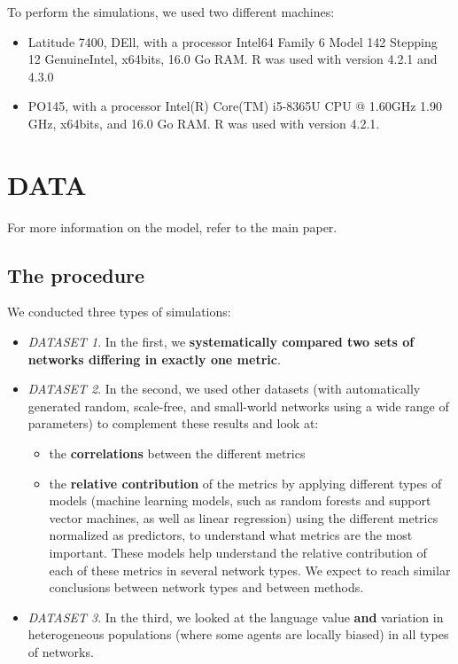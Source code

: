 \documentclass[
]{article}
\providecommand{\tightlist}{%
  \setlength{\itemsep}{0pt}\setlength{\parskip}{0pt}}
\begin{document}
To perform the simulations, we used two different machines:

\begin{itemize}
\tightlist
\item
  Latitude 7400, DEll, with a processor Intel64 Family 6 Model 142
  Stepping 12 GenuineIntel, x64bits, 16.0 Go RAM. R was used with
  version 4.2.1 and 4.3.0
\item
  PO145, with a processor Intel(R) Core(TM) i5-8365U CPU @ 1.60GHz 1.90
  GHz, x64bits, and 16.0 Go RAM. R was used with version 4.2.1.
\end{itemize}

\hypertarget{data}{%
\section{DATA}\label{data}}

For more information on the model, refer to the main paper.

\hypertarget{the-procedure}{%
\subsection{The procedure}\label{the-procedure}}

We conducted three types of simulations:

\begin{itemize}
\item
  \emph{DATASET 1}. In the first, we \textbf{systematically compared two
  sets of networks differing in exactly one metric}.
\item
  \emph{DATASET 2}. In the second, we used other datasets (with
  automatically generated random, scale-free, and small-world networks
  using a wide range of parameters) to complement these results and look
  at:

  \begin{itemize}
  \tightlist
  \item
    the \textbf{correlations} between the different metrics
  \item
    the \textbf{relative contribution} of the metrics by applying
    different types of models (machine learning models, such as random
    forests and support vector machines, as well as linear regression)
    using the different metrics normalized as predictors, to understand
    what metrics are the most important. These models help understand
    the relative contribution of each of these metrics in several
    network types. We expect to reach similar conclusions between
    network types and between methods.
  \end{itemize}
\item
  \emph{DATASET 3}. In the third, we looked at the language value
  \textbf{and} variation in heterogeneous populations (where some agents
  are locally biased) in all types of networks.
\end{itemize}
\end{document}
